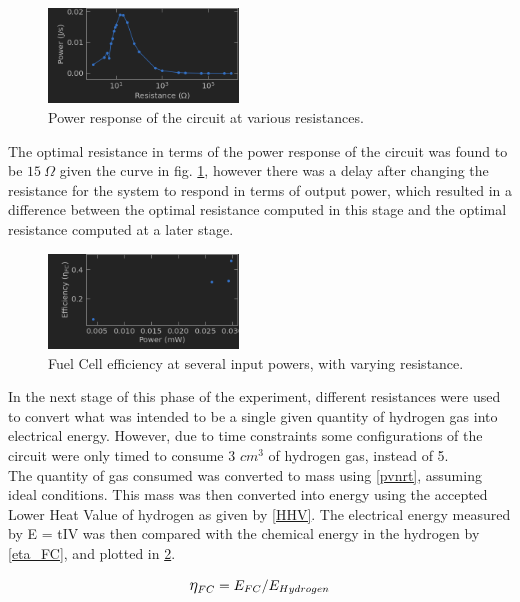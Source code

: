\documentclass[aps,prl,reprint]{revtex4-2}
\begin{document}
\begin{figure}[h]
\includegraphics[width=0.45\textwidth]{../Images/l1_d_2_trial_b.png}
\caption{\label{P(R)D}Power response of the circuit at various resistances.}
\end{figure}

The optimal resistance in terms of the power response of the circuit
was found to be $15\ \Omega$ given the curve in fig. \ref{P(R)D}, 
however there was a 
delay after changing the resistance for the system to respond in terms of
output power, which resulted in a difference between the optimal resistance
computed in this stage and the optimal resistance computed at a later stage.\\

\begin{figure}[h]
\includegraphics[width=0.45\textwidth]{../Images/l1_d_3.png}
\caption{\label{FC_n}Fuel Cell efficiency at several input powers, with varying resistance.}
\end{figure}

In the next stage of this phase of the experiment, different resistances were
used to convert what was intended to be a single given quantity of hydrogen gas 
into electrical energy. However, due to time constraints some configurations of
the circuit were only timed to consume 3 $cm^3$ of hydrogen gas, instead of 5.\\

The quantity of gas consumed was converted to mass using \ref{pvnrt}, assuming
ideal conditions. This mass was then converted into energy using the accepted
Lower Heat Value of hydrogen as given by \ref{HHV}. The electrical energy 
measured by E = tIV was then compared with the chemical energy in the hydrogen 
by \ref{eta_FC}, and plotted in \ref{FC_n}.

\begin{equation}
    \mathlarger{\eta}_{FC}=E_{FC}/E_{Hydrogen}
    \label{eta_FC}
\end{equation}
\end{document}
